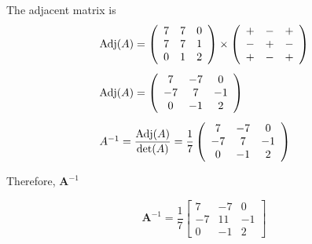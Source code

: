 The adjacent matrix is
$$
\begin{array}{l}
\operatorname{Adj}(A)=\left(\begin{array}{ccc}
7 & 7 & 0 \\
7 & 7 & 1 \\
0 & 1 & 2
\end{array}\right) \times\left(\begin{array}{rrr}
+ & - & + \\
- & + & - \\
+ & - & +
\end{array}\right) \vspace{3mm}\\
\operatorname{Adj}(A)=\left(\begin{array}{ccc}
7 & -7 & 0 \\
-7 & 7 & -1 \\
0 & -1 & 2
\end{array}\right) \vspace{3mm}\\
A^{-1}=\dfrac{\operatorname{Adj}(A)}{\operatorname{det}(A)}=\dfrac{1}{7}\left(\begin{array}{ccc}
7 & -7 & 0 \\
-7 & 7 & -1 \\
0 & -1 & 2
\end{array}\right)
\end{array}
$$

Therefore, $\mathbf{A}^{-1}$


$$\mathbf{A}^{-1}=\frac{1}{7}\begin{bmatrix}{7} & {-7} & {0} \\ {-7} & {11} & {-1} \\ {0} & {-1} & {2}\end{bmatrix}$$

\newpage

